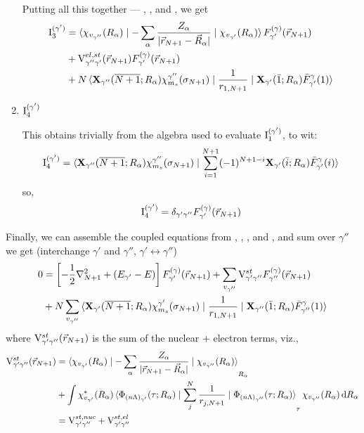 \documentclass[aps,pra,groupedaddress,12pt,
               amsfonts,amssymb,
               preprint
    ]{revtex4}
\begin{document}
\begin{enumerate}
Putting all this together --- , , and ,
we get
\begin{equation}
  \label{eq:intg3k}
  \begin{split}
   \mathrm{I}_3^{(\gamma')} &=\mathinner{\langle{{\chi_{v_{\gamma''}}(R_\alpha)} \mid {-\sum_\alpha\dfrac{Z_\alpha}{|\vec{r}_{N+1}-\vec{R}_\alpha|}} \mid {\chi_{v_{\gamma'}}(R_\alpha)}}\rangle}F_{\gamma'}^{(\gamma)}(\vec{r}_{N+1}) \\
                   &+ \mathrm{V}_{\gamma''\gamma'}^{el,st}(\vec{r}_{N+1})F_{\gamma'}^{(\gamma)}(\vec{r}_{N+1}) \\
                   &+N\mathinner{\langle{{\mathbf{X}_{\gamma''}(\overline{N+1};R_\alpha)\chi_{m_s}^{\gamma''}(\sigma_{N+1})} \mid {\dfrac{1}{r_{1,N+1}}} \mid {\mathbf{X}_{\gamma'}(\bar{1};R_\alpha)\bar{F}_{\gamma'}^{\gamma}(1)}}\rangle}
  \end{split}
\end{equation}
\item  $\mathrm{I}_4^{(\gamma')}$

This obtains trivially from the algebra used to evaluate
$\mathrm{I}_1^{(\gamma')}$, to wit:
\begin{equation*}
  \mathrm{I}_4^{(\gamma')} =
  \mathinner{\langle{{\mathbf{X}_{\gamma''}(\overline{N+1};R_\alpha)\chi_{m_s}^{\gamma''}(\sigma_{N+1})} \mid {\sum_{i=1}^{N+1}(-1)^{N+1-i}\mathbf{X}_{\gamma'}(\bar{i};R_\alpha)\bar{F}_{\gamma'}^{\gamma}(i)}}\rangle} 
\end{equation*}
so,
\begin{equation}
  \label{eq:intg4}
  \mathrm{I}_4^{(\gamma')} = \delta_{\gamma'\gamma''}F_{\gamma'}^{(\gamma)}(\vec{r}_{N+1})
\end{equation}
\end{enumerate}

Finally, we can assemble the coupled equations from ,
, , and , and sum over $\gamma''$ we get
(interchange $\gamma'$ and $\gamma''$, $\gamma'\leftrightarrow\gamma''$)
\begin{equation}
  \label{eq:sc}
  \begin{split}
    0 &= \left[-\dfrac{1}{2}\nabla^2_{N+1}+(E_{\gamma'}-E)\right]F_{\gamma'}^{(\gamma)}(\vec{r}_{N+1}) 
         + \sum_{v_{\gamma''}}\mathrm{V}_{\gamma'\gamma''}^{st}F_{\gamma''}^{(\gamma)}(\vec{r}_{N+1}) \\
      &+N\sum_{v_{\gamma''}}
       \mathinner{\langle{{\mathbf{X}_{\gamma'}(\overline{N+1};R_\alpha)\chi_{m_s}^{\gamma'}(\sigma_{N+1})} \mid {\dfrac{1}{r_{1,N+1}}} \mid {\mathbf{X}_{\gamma''}(\bar{1};R_\alpha)\bar{F}_{\gamma''}^{\gamma}(1)}}\rangle}
  \end{split}
\end{equation}
where $\mathrm{V}_{\gamma'\gamma''}^{st}(\vec{r}_{N+1})$ is the sum of the nuclear $+$ electron terms, viz.,
\begin{equation}
  \label{eq:vemst}
  \begin{split}
    \mathrm{V}_{\gamma'\gamma''}^{st}(\vec{r}_{N+1}) &= \mathinner{\langle{{\chi_{v_{\gamma'}}(R_\alpha)} \mid {-\sum_\alpha\dfrac{Z_\alpha}{|\vec{r}_{N+1}-\vec{R}_\alpha|}} \mid {\chi_{v_{\gamma''}}(R_\alpha)}}\rangle}_{R_\alpha} \\
          &+\int\chi_{v_{\gamma'}}^*(R_\alpha)
            \mathinner{\langle{{\Phi_{(n\Lambda)_{\gamma'}}(\tau;R_\alpha)} \mid {\sum_j^N\dfrac{1}{r_{j,N+1}}} \mid {\Phi_{(n\Lambda)_{\gamma''}}(\tau;R_\alpha)}}\rangle}_\tau
            \chi_{v_{\gamma''}}(R_\alpha)\,\mathrm{d}R_\alpha \\
          & = \mathrm{V}_{\gamma'\gamma''}^{st,nuc} + \mathrm{V}_{\gamma'\gamma''}^{st,el}
  \end{split}
\end{equation}
\end{document}
